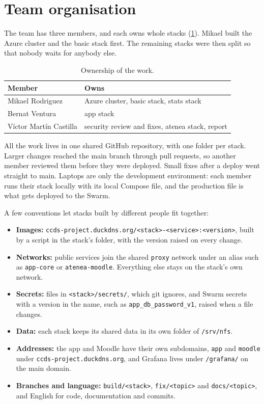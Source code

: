 \section{Team organisation}
\label{sec:team}

The team has three members, and each owns whole stacks
(\cref{tab:team}). Mikael built the Azure cluster and the basic stack
first. The remaining stacks were then split so that nobody waits for
anybody else.

\begin{table}[htbp]
  \centering
  \caption{Ownership of the work.}
  \label{tab:team}
  \begin{tabular}{ll}
    \toprule
    Member                  & Owns \\
    \midrule
    Mikael Rodriguez        & Azure cluster, basic stack, stats stack \\
    Bernat Ventura          & app stack \\
    Víctor Martín Castilla  & security review and fixes, atenea stack, report \\
    \bottomrule
  \end{tabular}
\end{table}

All the work lives in one shared GitHub repository, with one folder per
stack. Larger changes reached the main branch through pull requests, so
another member reviewed them before they were deployed. Small fixes
after a deploy went straight to main. Laptops are only the development
environment: each member runs their stack locally with its local Compose
file, and the production file is what gets deployed to the Swarm.

A few conventions let stacks built by different people fit together:
\begin{itemize}
  \item \textbf{Images:}
        \texttt{ccds-project.duckdns.org/<stack>-<service>:<version>},
        built by a script in the stack's folder, with the version raised
        on every change.
  \item \textbf{Networks:} public services join the shared \texttt{proxy}
        network under an alias such as \texttt{app-core} or
        \texttt{atenea-moodle}. Everything else stays on the stack's own
        network.
  \item \textbf{Secrets:} files in \texttt{<stack>/secrets/}, which git
        ignores, and Swarm secrets with a version in the name, such as
        \texttt{app\_db\_password\_v1}, raised when a file changes.
  \item \textbf{Data:} each stack keeps its shared data in its own folder
        of \texttt{/srv/nfs}.
  \item \textbf{Addresses:} the app and Moodle have their own
        subdomains, \texttt{app} and \texttt{moodle} under
        \texttt{ccds-project.duckdns.org}, and Grafana lives under
        \texttt{/grafana/} on the main domain.
  \item \textbf{Branches and language:} \texttt{build/<stack>},
        \texttt{fix/<topic>} and \texttt{docs/<topic>}, and English for
        code, documentation and commits.
\end{itemize}
